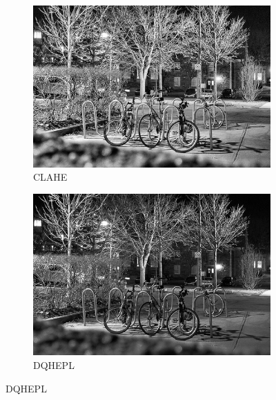 \documentclass[sigchi]{acmart}
\begin{document}
\begin{figure}[htbp]
	\begin{subfigure}[b]{0.32\textwidth}
		\centering
		\includegraphics[width=\linewidth]{./procesadas/2015_00002/2015_00002_clahe.png}
		\caption{CLAHE}
	\end{subfigure}
	\hfill
	\begin{subfigure}[b]{0.32\textwidth}
		\centering
		\includegraphics[width=\linewidth]{./procesadas/2015_00002/2015_00002_dqhepl.png}
		\caption{DQHEPL}
	\end{subfigure}


\end{figure}
\end{document}
